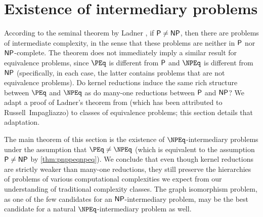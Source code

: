 \newcommand{\floor}[1]{\lfloor #1 \rfloor}
\section{Existence of intermediary problems}
\label{sec:intermediary}
%
According to the seminal theorem by Ladner \autocite{ladner75}, if $\P \neq \NP$, then there are problems of intermediate complexity, in the sense that these problems are neither in $\P$ nor $\NP$-complete.
The theorem does not immediately imply a similar result for equivalence problems, since $\PEq$ is different from $\P$ and $\NPEq$ is different from $\NP$ (specifically, in each case, the latter contains problems that are not equivalence problems).
Do kernel reductions induce the same rich structure between $\PEq$ and $\NPEq$ as do many-one reductions between $\P$ and $\NP$?
We adapt a proof of Ladner's theorem from \autocite{df03} (which has been attributed to Russell~Impagliazzo) to classes of equivalence problems;
this section details that adaptation.

%
The main theorem of this section is the existence of $\NPEq$-intermediary problems under the assumption that $\PEq \neq \NPEq$ (which is equivalent to the assumption $\P \neq \NP$ by \autoref{thm:pnppeqnpeq}).
We conclude that even though kernel reductions are strictly weaker than many-one reductions, they still preserve the hierarchies of problems of various computational complexities we expect from our understanding of traditional complexity classes.
The graph isomorphism problem, as one of the few candidates for an $\NP$-intermediary problem, may be the best candidate for a natural $\NPEq$-intermediary problem as well.

